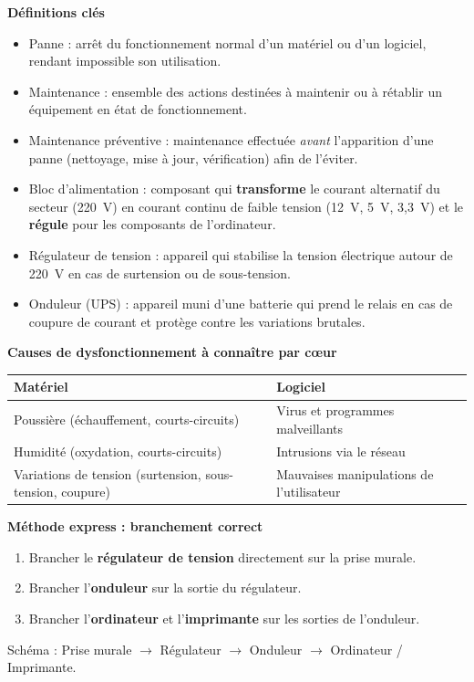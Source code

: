 \documentclass[11pt]{article}
\newcommand{\cle}[1]{{\popxbold\color{popdark}#1}}
\begin{document}
\begin{bilan}
\textbf{Définitions clés}
\begin{itemize}
  \item \cle{Panne} : arrêt du fonctionnement normal d'un matériel ou d'un logiciel, rendant impossible son utilisation.
  \item \cle{Maintenance} : ensemble des actions destinées à maintenir ou à rétablir un équipement en état de fonctionnement.
  \item \cle{Maintenance préventive} : maintenance effectuée \emph{avant} l'apparition d'une panne (nettoyage, mise à jour, vérification) afin de l'éviter.
  \item \cle{Bloc d'alimentation} : composant qui \textbf{transforme} le courant alternatif du secteur (220~V) en courant continu de faible tension (12~V, 5~V, 3,3~V) et le \textbf{régule} pour les composants de l'ordinateur.
  \item \cle{Régulateur de tension} : appareil qui stabilise la tension électrique autour de 220~V en cas de surtension ou de sous-tension.
  \item \cle{Onduleur} (UPS) : appareil muni d'une batterie qui prend le relais en cas de coupure de courant et protège contre les variations brutales.
\end{itemize}

\textbf{Causes de dysfonctionnement à connaître par cœur}
\begin{center}
\begin{tabularx}{\linewidth}{|l|X|}
\hline
\rowcolor{popblueL} \textbf{Matériel} & \textbf{Logiciel} \\
\hline
Poussière (échauffement, courts-circuits) & Virus et programmes malveillants \\
\hline
Humidité (oxydation, courts-circuits) & Intrusions via le réseau \\
\hline
Variations de tension (surtension, sous-tension, coupure) & Mauvaises manipulations de l'utilisateur \\
\hline
\end{tabularx}
\end{center}

\textbf{Méthode express : branchement correct}
\begin{enumerate}
  \item Brancher le \textbf{régulateur de tension} directement sur la prise murale.
  \item Brancher l'\textbf{onduleur} sur la sortie du régulateur.
  \item Brancher l'\textbf{ordinateur} et l'\textbf{imprimante} sur les sorties de l'onduleur.
\end{enumerate}
Schéma : Prise murale $\rightarrow$ Régulateur $\rightarrow$ Onduleur $\rightarrow$ Ordinateur / Imprimante.


\end{bilan}
\end{document}
